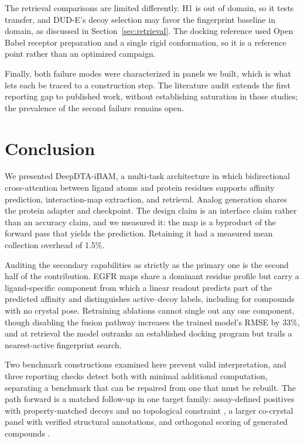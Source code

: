 \documentclass{ieeeaccess}
\begin{document}
The retrieval comparisons are limited differently. H1 is out of domain, so it
tests transfer, and DUD-E's decoy selection may favor the fingerprint baseline
in domain, as discussed in Section~\ref{sec:retrieval}. The docking
reference used Open Babel receptor preparation and a single rigid conformation,
so it is a reference point rather than an optimized campaign.

Finally, both failure modes were characterized in panels we built, which is what
lets each be traced to a construction step. The literature audit extends the
first reporting gap to published work, without establishing saturation in those
studies; the prevalence of the second failure remains open.

\section{Conclusion}
We presented DeepDTA-iBAM, a multi-task architecture in which bidirectional
cross-attention between ligand atoms and protein residues supports affinity
prediction, interaction-map extraction, and retrieval. Analog generation shares
the protein adapter and checkpoint. The design claim is an interface
claim rather than an accuracy claim, and we measured it: the map is a byproduct
of the forward pass that yields the prediction. Retaining it had a measured
mean collection overhead of 1.5\%.

Auditing the secondary capabilities as strictly as the primary one is the second
half of the contribution. EGFR maps share a dominant residue profile but carry a
ligand-specific component from which a linear readout predicts part of the
predicted affinity and distinguishes active--decoy labels, including for compounds with no
crystal pose. Retraining ablations cannot single out any one component, though
disabling the fusion pathway increases the trained
model's RMSE by 33\%, and at retrieval the model outranks an established docking
program but trails a nearest-active fingerprint search.

Two benchmark constructions examined here prevent valid interpretation, and
three reporting checks detect both with minimal additional computation, separating a
benchmark that can be repaired from one that must be rebuilt. The path forward
is a matched follow-up in one target family: assay-defined positives with
property-matched decoys and no topological constraint
\cite{mysinger2012dude,trannguyen2020litpcba}, a larger co-crystal panel with verified structural annotations, and orthogonal scoring of generated compounds
\cite{vamathevan2019ml,stokes2020antibiotic}.
\end{document}

